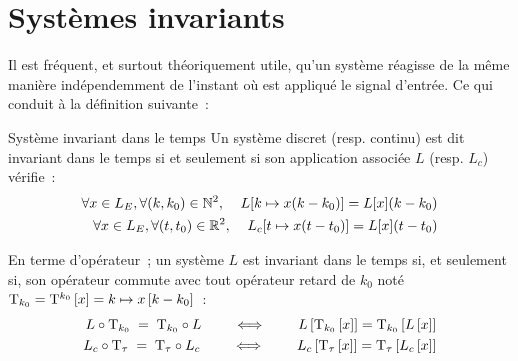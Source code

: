 
\section{Systèmes invariants}
Il est fréquent, et surtout théoriquement utile, qu'un système
réagisse de la même manière indépendemment de l'instant où est
appliqué le signal d'entrée. Ce qui conduit à la définition suivante~:
\begin{definition}{Système invariant dans le temps}
  Un système discret (resp. continu) est dit invariant dans le temps
  si et seulement si son application associée $L$ (resp. $L_c$)
  vérifie~:
  \begin{eqnarray}
    \forall x\in L_E, \forall (k,k_0)\in \mathbb{N}^2, \;\;\;\; L[k\mapsto x(k-k_{0})] = L[x](k-k_{0}) \\
    \forall x\in L_E, \forall (t,t_0)\in \mathbb{R}^2, \;\;\;\; L_c[t\mapsto x(t-t_{0})] = L[x](t-t_{0}) 
  \end{eqnarray}
  
  En terme d'opérateur~; un système $L$ est invariant dans le temps
  si, et seulement si, son opérateur commute avec tout opérateur
  retard de $k_0$ noté
  $\mathrm{T}_{k_0}=\mathrm{T}^{k_0}\left[x\right]= k\mapsto x\left[k-k_0\right]$~:
  \begin{eqnarray}
    \label{eq:sys_invariant}
    L\circ\mathrm{T}_{k_0} \; = \; \mathrm{T}_{k_0}\circ L  \qquad \iff \qquad  L\left[\mathrm{T}_{k_0}\left[x\right]\right] = \mathrm{T}_{k_0}\left[L\left[x\right]\right]
    \\
    L_c\circ\mathrm{T}_{\tau} \; = \; \mathrm{T}_{\tau}\circ L_c  \qquad \iff \qquad  L_c\left[\mathrm{T}_{\tau}\left[x\right]\right] = \mathrm{T}_{\tau}\left[L_c\left[x\right]\right]
  \end{eqnarray}
\end{definition}

